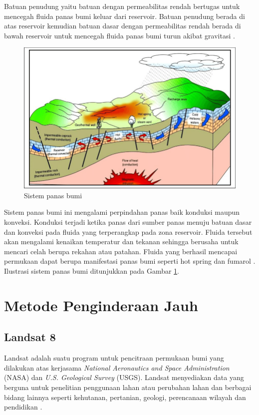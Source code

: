 \hspace{25pt}Batuan penudung yaitu batuan dengan permeabilitas rendah bertugas untuk mencegah fluida panas bumi keluar dari reservoir. Batuan penudung berada di atas reservoir kemudian batuan dasar dengan permeabilitas rendah berada di bawah reservoir untuk mencegah fluida panas bumi turun akibat gravitasi \citep{GuptaRoy2007}.


\begin{figure}[h]
	\centering
	\includegraphics[scale=0.35]{Figs/geothermal.png}
	\caption{Sistem panas bumi}
	\label{fig:geothermal}
\end{figure}

\hspace{25pt}Sistem panas bumi ini mengalami perpindahan panas baik konduksi maupun konveksi. Konduksi terjadi ketika panas dari sumber panas menuju batuan dasar dan konveksi pada fluida yang terperangkap pada zona reservoir. Fluida tersebut akan mengalami kenaikan temperatur dan tekanan sehingga berusaha untuk mencari celah berupa rekahan atau patahan. Fluida yang berhasil mencapai permukaan dapat berupa manifestasi panas bumi seperti hot spring dan fumarol \citep{White1973}. Ilustrasi sistem panas bumi ditunjukkan pada Gambar \ref{fig:geothermal}.

\section{Metode Penginderaan Jauh}
\subsection{Landsat 8}
\hspace{25pt}Landsat adalah suatu program untuk pencitraan permukaan bumi yang dilakukan atas kerjasama \textit{National Aeronautics and Space Administration} (NASA) dan \textit{U.S. Geological Survey} (USGS). Landsat menyediakan data yang berguna untuk penelitian penggunaan lahan atau perubahan lahan dan berbagai bidang lainnya seperti kehutanan, pertanian, geologi, perencanaan wilayah dan pendidikan \citep{USGS2022}. 

